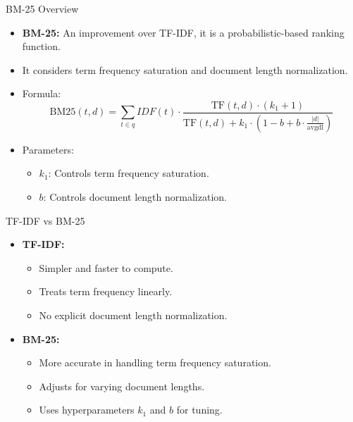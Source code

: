 \documentclass{beamer}
\begin{document}
\begin{frame}{BM-25 Overview}
    \begin{itemize}
        \item \textbf{BM-25:} An improvement over TF-IDF, it is a probabilistic-based ranking function.
        \item It considers term frequency saturation and document length normalization.
        \item Formula:
        \[
        \text{BM25}(t, d) = \sum_{t \in q} IDF(t) \cdot \frac{\text{TF}(t, d) \cdot (k_1 + 1)}{\text{TF}(t, d) + k_1 \cdot \left(1 - b + b \cdot \frac{|d|}{\text{avgdl}}\right)}
        \]
        \item Parameters:
        \begin{itemize}
            \item \(k_1\): Controls term frequency saturation.
            \item \(b\): Controls document length normalization.
        \end{itemize}
    \end{itemize}
\end{frame}

\begin{frame}{TF-IDF vs BM-25}
    \begin{itemize}
        \item \textbf{TF-IDF:}
        \begin{itemize}
            \item Simpler and faster to compute.
            \item Treats term frequency linearly.
            \item No explicit document length normalization.
        \end{itemize}
        \item \textbf{BM-25:}
        \begin{itemize}
            \item More accurate in handling term frequency saturation.
            \item Adjusts for varying document lengths.
            \item Uses hyperparameters \(k_1\) and \(b\) for tuning.
        \end{itemize}
    \end{itemize}
\end{frame}
\end{document}
